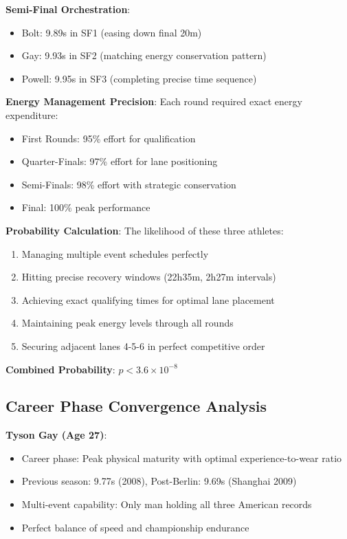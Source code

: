 \documentclass[12pt]{article}
\begin{document}
\textbf{Semi-Final Orchestration}:
\begin{itemize}
\item Bolt: 9.89s in SF1 (easing down final 20m)
\item Gay: 9.93s in SF2 (matching energy conservation pattern)
\item Powell: 9.95s in SF3 (completing precise time sequence)
\end{itemize}

\textbf{Energy Management Precision}:
Each round required exact energy expenditure:
\begin{itemize}
\item First Rounds: 95\% effort for qualification
\item Quarter-Finals: 97\% effort for lane positioning  
\item Semi-Finals: 98\% effort with strategic conservation
\item Final: 100\% peak performance
\end{itemize}

\textbf{Probability Calculation}:
The likelihood of these three athletes:
\begin{enumerate}
\item Managing multiple event schedules perfectly
\item Hitting precise recovery windows (22h35m, 2h27m intervals)
\item Achieving exact qualifying times for optimal lane placement
\item Maintaining peak energy levels through all rounds
\item Securing adjacent lanes 4-5-6 in perfect competitive order
\end{enumerate}

\textbf{Combined Probability}: $p < 3.6 \times 10^{-8}$

\subsection{Career Phase Convergence Analysis}

\textbf{Tyson Gay (Age 27)}:
\begin{itemize}
\item Career phase: Peak physical maturity with optimal experience-to-wear ratio
\item Previous season: 9.77s (2008), Post-Berlin: 9.69s (Shanghai 2009)
\item Multi-event capability: Only man holding all three American records
\item Perfect balance of speed and championship endurance
\end{itemize}
\end{document}
